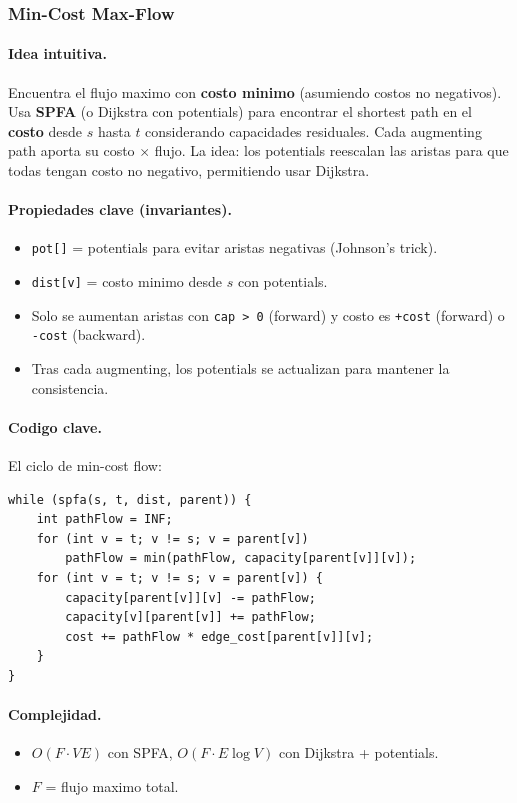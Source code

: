 ﻿\subsubsection{Min-Cost Max-Flow}

\paragraph{Idea intuitiva.}
Encuentra el flujo maximo con \textbf{costo minimo} (asumiendo costos no negativos). Usa \textbf{SPFA} (o Dijkstra con potentials) para encontrar el shortest path en el \textbf{costo} desde $s$ hasta $t$ considerando capacidades residuales. Cada augmenting path aporta su costo $\times$ flujo. La idea: los potentials reescalan las aristas para que todas tengan costo no negativo, permitiendo usar Dijkstra.

\paragraph{Propiedades clave (invariantes).}
\begin{itemize}\setlength\itemsep{0pt}
	\item \texttt{pot[]} = potentials para evitar aristas negativas (Johnson's trick).
	\item \texttt{dist[v]} = costo minimo desde $s$ con potentials.
	\item Solo se aumentan aristas con \texttt{cap > 0} (forward) y costo es \texttt{+cost} (forward) o \texttt{-cost} (backward).
	\item Tras cada augmenting, los potentials se actualizan para mantener la consistencia.
\end{itemize}

\paragraph{Codigo clave.}
El ciclo de min-cost flow:
\begin{verbatim}
while (spfa(s, t, dist, parent)) {
    int pathFlow = INF;
    for (int v = t; v != s; v = parent[v])
        pathFlow = min(pathFlow, capacity[parent[v]][v]);
    for (int v = t; v != s; v = parent[v]) {
        capacity[parent[v]][v] -= pathFlow;
        capacity[v][parent[v]] += pathFlow;
        cost += pathFlow * edge_cost[parent[v]][v];
    }
}
\end{verbatim}

\paragraph{Complejidad.}
\begin{itemize}\setlength\itemsep{0pt}
	\item $O(F \cdot V E)$ con SPFA, $O(F \cdot E \log V)$ con Dijkstra + potentials.
	\item $F$ = flujo maximo total.
\end{itemize}

